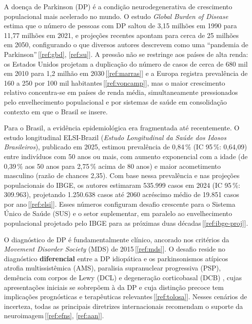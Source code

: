 \documentclass[12pt,a4paper,oneside]{article}
\begin{document}
A doença de Parkinson (DP) é a condição neurodegenerativa de
crescimento populacional mais acelerado no mundo. O estudo
\textit{Global Burden of Disease} estima que o número de pessoas com
DP saltou de 3,15 milhões em 1990 para 11,77 milhões em 2021, e
projeções recentes apontam para cerca de 25 milhões em 2050,
configurando o que diversos autores descrevem como uma
``pandemia de Parkinson''\,[\ref{ref:gbd}, \ref{ref:su}]. A pressão
não se restringe aos países de alta renda: os Estados Unidos projetam
a duplicação do número de casos \textemdash{} de cerca de 680 mil em
2010 para 1,2 milhão em 2030\,[\ref{ref:marras}] \textemdash{} e a
Europa registra prevalência de 160 a 250 por 100 mil
habitantes\,[\ref{ref:voncamp}], mas o maior crescimento relativo
concentra-se em países de renda média, simultaneamente pressionados
pelo envelhecimento populacional e por sistemas de saúde em
consolidação \textemdash{} contexto em que o Brasil se insere.

Para o Brasil, a evidência epidemiológica era fragmentada até
recentemente. O estudo longitudinal ELSI-Brazil (\textit{Estudo
Longitudinal da Saúde dos Idosos Brasileiros}), publicado em 2025,
estimou prevalência de 0,84\,\% (IC 95\,\%: 0,64,09)
entre indivíduos com 50 anos ou mais, com aumento exponencial com a
idade (de 0,39\,\% aos 50 anos para 2,75\,\% acima de 80
anos) e maior acometimento masculino (razão de chances 2,35). Com base
nessa prevalência e nas projeções populacionais do IBGE, os autores
estimaram 535.999 casos em 2024 (IC 95\,\%: 309.963),
projetando 1.250.638 casos até 2060 \textemdash{} acréscimo médio de
19.851 casos por ano\,[\ref{ref:elsi}]. Esses números configuram
desafio crescente para o Sistema Único de Saúde (SUS) e o setor
suplementar, em paralelo ao envelhecimento populacional projetado
pelo IBGE para as próximas duas décadas\,[\ref{ref:ibge-proj}].

O diagnóstico de DP é fundamentalmente clínico, ancorado nos
critérios da \textit{Movement Disorder Society} (MDS) de
2015\,[\ref{ref:mds}]. O desafio reside no diagnóstico
\textbf{diferencial} entre a DP idiopática e os parkinsonismos
atípicos \textemdash{} atrofia multissistêmica (AMS), paralisia
supranuclear progressiva (PSP), demência com corpos de Lewy (DCL) e
degeneração corticobasal (DCB) \textemdash{}, cujas apresentações
iniciais se sobrepõem à da DP e cuja distinção precoce tem
implicações prognósticas e terapêuticas relevantes\,[\ref{ref:tolosa}].
Nesses cenários de incerteza, todas as principais diretrizes
internacionais recomendam o suporte da neuroimagem\,[\ref{ref:efns},
\ref{ref:aan}].
\end{document}
